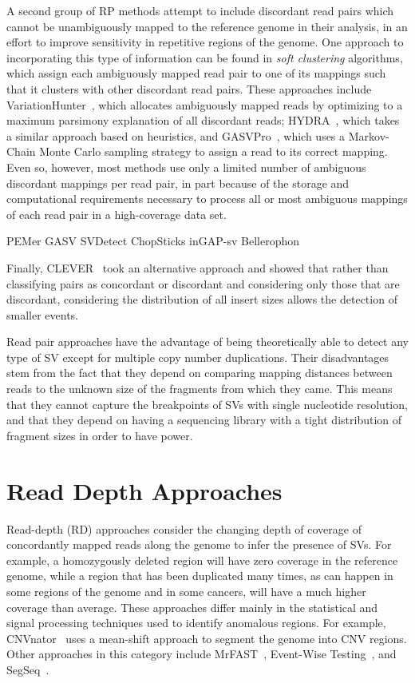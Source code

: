 A second group of RP methods attempt to include discordant read pairs which cannot be unambiguously mapped to the reference genome in their analysis, in an effort to improve sensitivity in repetitive regions of the genome. One approach to incorporating this type of information can be found in \emph{soft clustering} algorithms, which assign each ambiguously mapped read pair to one of its mappings such that it clusters with other discordant read pairs. These approaches include VariationHunter~\cite{Hormozdiari:2009p284}, which allocates ambiguously mapped reads by optimizing to a maximum parsimony explanation of all discordant reads; HYDRA~\cite{Quinlan:2010gf}, which takes a similar approach based on heuristics, and GASVPro~\cite{Sindi:2012kk}, which uses a Markov-Chain Monte Carlo sampling strategy to assign a read to its correct mapping. Even so, however, most methods use only a limited number of ambiguous discordant mappings per read pair, in part because of the storage and computational requirements necessary to process all or most ambiguous mappings of each read pair in a high-coverage data set.

PEMer
GASV
SVDetect
ChopSticks
inGAP-sv
Bellerophon

Finally, CLEVER~\cite{Marschall:2012ek} took an alternative approach and showed that rather than classifying pairs as concordant or discordant and considering only those that are discordant, considering the distribution of all insert sizes allows the detection of smaller events. 

Read pair approaches have the advantage of being theoretically able to detect any type of SV except for multiple copy number duplications. Their disadvantages stem from the fact that they depend on comparing mapping distances between reads to the unknown size of the fragments from which they came. This means that they cannot capture the breakpoints of SVs with single nucleotide resolution, and that they depend on having a sequencing library with a tight distribution of fragment sizes in order to have power.

\section{Read Depth Approaches}

Read-depth (RD) approaches consider the changing depth of coverage of concordantly mapped reads along the genome to infer the presence of SVs. For example, a homozygously deleted region will have zero coverage in the reference genome, while a region that has been duplicated many times, as can happen in some regions of the genome and in some cancers, will have a much higher coverage than average. These approaches differ mainly in the statistical and signal processing techniques used to identify anomalous regions. For example, CNVnator~\cite{Abyzov:2011bk} uses a mean-shift approach to segment the genome into CNV regions. Other approaches in this category include MrFAST~\cite{Alkan:2009cr}, Event-Wise Testing~\cite{Yoon:2009kb}, and SegSeq~\cite{Chiang:2009di}.

